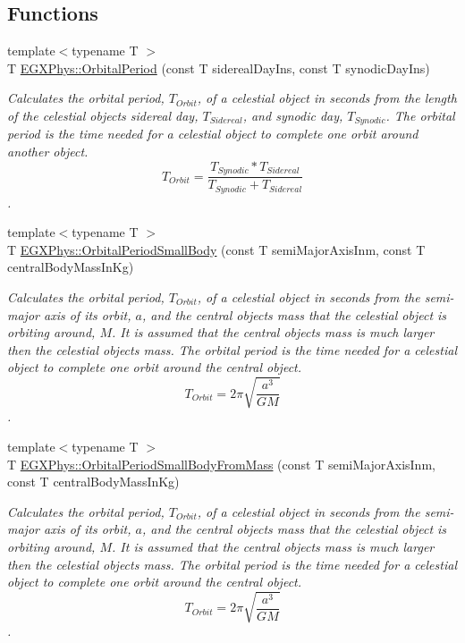 \subsection*{Functions}
\begin{DoxyCompactItemize}
\item 
{\footnotesize template$<$typename T $>$ }\\T \mbox{\hyperlink{group___e_g_x_phys-_astrophysic-_orbital_period_ga76aac7afe3b7a30a785259e9eeb0c139}{E\+G\+X\+Phys\+::\+Orbital\+Period}} (const T sidereal\+Day\+Ins, const T synodic\+Day\+Ins)
\begin{DoxyCompactList}\small\item\em Calculates the orbital period, $T_{Orbit}$, of a celestial object in seconds from the length of the celestial object\textquotesingle{}s sidereal day, $T_{Sidereal}$, and synodic day, $T_{Synodic}$. The orbital period is the time needed for a celestial object to complete one orbit around another object. \[ T_{Orbit}=\dfrac{T_{Synodic} * T_{Sidereal}}{T_{Synodic} + T_{Sidereal}}\]. \end{DoxyCompactList}\item 
{\footnotesize template$<$typename T $>$ }\\T \mbox{\hyperlink{group___e_g_x_phys-_astrophysic-_orbital_period_ga5d4cc706d875fd82a83e566ade16546d}{E\+G\+X\+Phys\+::\+Orbital\+Period\+Small\+Body}} (const T semi\+Major\+Axis\+Inm, const T central\+Body\+Mass\+In\+Kg)
\begin{DoxyCompactList}\small\item\em Calculates the orbital period, $T_{Orbit}$, of a celestial object in seconds from the semi-\/major axis of its orbit, $a$, and the central object\textquotesingle{}s mass that the celestial object is orbiting around, $M$. It is assumed that the central object\textquotesingle{}s mass is much larger then the celestial objects mass. The orbital period is the time needed for a celestial object to complete one orbit around the central object. \[ T_{Orbit}=2\pi\sqrt{\dfrac{a^3}{GM}}\]. \end{DoxyCompactList}\item 
{\footnotesize template$<$typename T $>$ }\\T \mbox{\hyperlink{group___e_g_x_phys-_astrophysic-_orbital_period_gadfd6fdd5cb1861d8204c3c5cd32a65b5}{E\+G\+X\+Phys\+::\+Orbital\+Period\+Small\+Body\+From\+Mass}} (const T semi\+Major\+Axis\+Inm, const T central\+Body\+Mass\+In\+Kg)
\begin{DoxyCompactList}\small\item\em Calculates the orbital period, $T_{Orbit}$, of a celestial object in seconds from the semi-\/major axis of its orbit, $a$, and the central object\textquotesingle{}s mass that the celestial object is orbiting around, $M$. It is assumed that the central object\textquotesingle{}s mass is much larger then the celestial objects mass. The orbital period is the time needed for a celestial object to complete one orbit around the central object. \[ T_{Orbit}=2\pi\sqrt{\dfrac{a^3}{GM}}\]. \end{DoxyCompactList}\item 

\end{DoxyCompactItemize}
